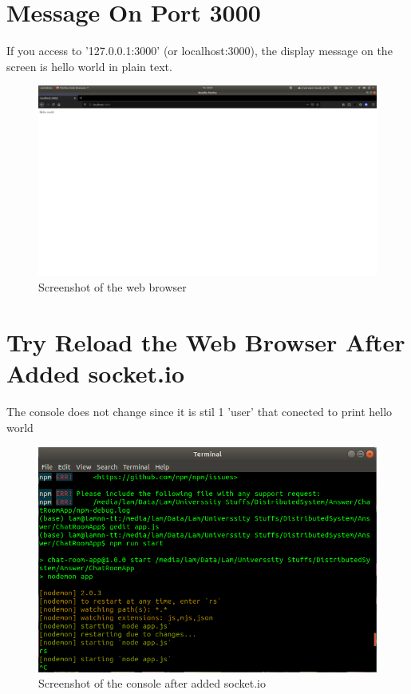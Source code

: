 \documentclass[11pt,a4paper]{article}
\begin{document}
	\section{Message On Port 3000}
	If you access to '127.0.0.1:3000' (or localhost:3000), the display message on the screen is hello world in plain text.
	\begin{figure}[h!]
  		\includegraphics[width=\linewidth]{mess-on-port-3k.png}
  		\caption{Screenshot of the web browser}
  		\label{fig:hello}
	\end{figure}
	\newpage
	\section{Try Reload the Web Browser After Added socket.io}
	The console does not change since it is stil 1 'user' that conected to print hello world
	\begin{figure}[h!]
  		\includegraphics[width=\linewidth]{reload-web-before.png}
  		\caption{Screenshot of the console after added socket.io}
  		\label{fig:console1}
	\end{figure}
	
\end{document}
